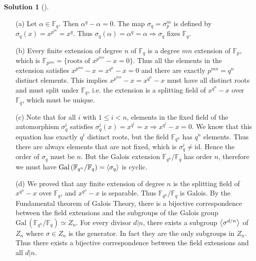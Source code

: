 \documentclass{article}
\theoremstyle{definition}
\newtheorem*{sol}{Solution}
\newenvironment{sols}[1][]{%
  \begin{sol}[#1]$ $\par\nobreak\ignorespaces
}{%
  \end{sol}
}
\newcommand{\FF}{\mathbb F}
\newcommand{\Ra}{\Rightarrow}
\newcommand{\Gal}{\text{Gal}\,}
\newcommand{\id}{\text{id}}
\begin{document}
\begin{sols}
	\begin{enumerate}
		\item[(a)] Let $\alpha \in \FF_q$.
			Then $\alpha^q - \alpha = 0$.
			The map $\sigma_q = \sigma_p^m$ is defined by $\sigma_q(x) = x^{p^m} = x^q$.
			Thus $\sigma_q(\alpha) = \alpha^q = \alpha \Ra \sigma_q$ fixes $\FF_q$.

		\item[(b)] Every finite extension of degree $n$ of $\FF_q$ is a degree $mn$ extension of $\FF_p$, which is $\FF_{p^{mn}} = \{\text{roots of }x^{p^{mn}} - x = 0\}$.
			Thus all the elements in the extension satisfies $x^{p^{mn}} - x = x^{q^n} - x = 0$ and there are exactly $p^{mn} = q^n$ distinct elements.
			This implies $x^{p^{mn}} - x = x^{q^n} - x$ must have all distinct roots and must split under $\FF_q$, i.e. the extension is a splitting field of $x^{q^n} - x$ over $\FF_q$, which must be unique.

		\item[(c)] Note that for all $i$ with $1 \leq i < n$, elements in the fixed field of the automorphism $\sigma_q^i$ satisfies $\sigma_q^i(x) = x^{q^i} = x \Ra x^{q^i} - x = 0$.
			We know that this equation has exactly $q^i$ distinct roots, but the field $\FF_{q^n}$ has $q^n$ elements.
			Thus there are always elements that are not fixed, which is $\sigma_q^i \neq \id$.
			Hence the order of $\sigma_q$ must be $n$.
			But the Galois extension $\FF_{q^n}/\FF_q$ has order $n$, therefore we must have $\Gal(\FF_{q^n}/\FF_q) = \ev{\sigma_q}$ is cyclic.

		\item[(d)] We proved that any finite extension of degree $n$ is the splitting field of $x^{q^n} - x$ over $\FF_q$, and $x^{q^n} - x$ is separable.
			Thus $\FF_{q^n}/\FF_q$ is Galois.
			By the Fundamental theorem of Galois Theory, there is a bijective correspondence between the field extensions and the subgroups of the Galois group $\Gal(\FF_{q^n}/\FF_q) \simeq Z_n$.
			For every divisor $d|n$, there exists a subgroup $\ev{\sigma^{d/n}}$ of $Z_n$ where $\sigma \in Z_n$ is the generator.
			In fact they are the only subgroups in $Z_n$.
			Thus there exists a bijective correspondence between the field extensions and all $d|n$.
	\end{enumerate}
\end{sols}
\end{document}
